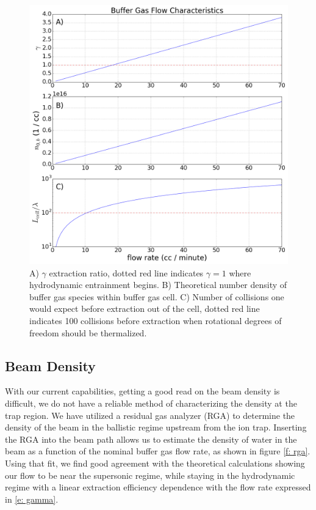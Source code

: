 \documentclass[a4paper]{article}
\begin{document}
\begin{figure} [H]
\centering
\includegraphics[width=1\textwidth]{Buffer_Gas_Flow_Characteristics.png}
\caption{A) $\gamma$ extraction ratio, dotted red line indicates $\gamma = 1$ where hydrodynamic entrainment begins. B) Theoretical number density of buffer gas species within buffer gas cell. C) Number of collisions one would expect before extraction out of the cell, dotted red line indicates 100 collisions before extraction when rotational degrees of freedom should be thermalized.}
\label{f: buffer_gas_flow}
\end{figure}

\subsection{Beam Density}

With our current capabilities, getting a good read on the beam density is difficult, we do not have a reliable method of characterizing the density at the trap region. We have utilized a residual gas analyzer (RGA) to determine the density of the beam in the ballistic regime upstream from the ion trap. Inserting the RGA into the beam path allows us to estimate the density of water in the beam as a function of the nominal buffer gas flow rate, as shown in figure \ref{f: rga}. Using that fit, we find good agreement with the theoretical calculations showing our flow to be near the supersonic regime, while staying in the hydrodynamic regime with a linear extraction efficiency dependence with the flow rate expressed in \ref{e: gamma}.
\end{document}
